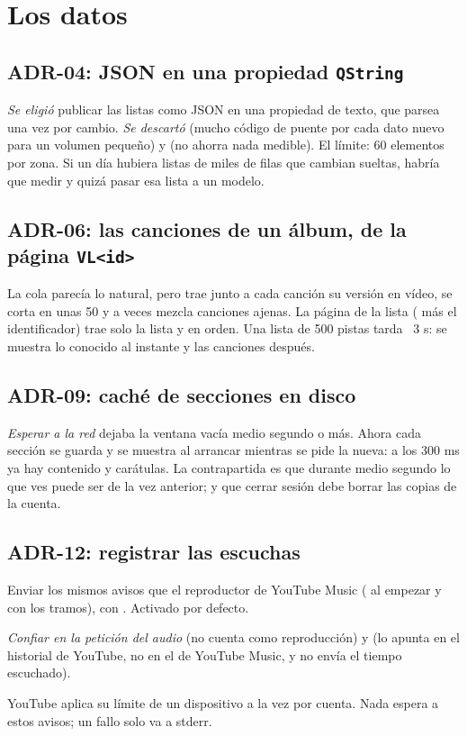 \section{Los datos}

\subsection{ADR-04: JSON en una propiedad \texttt{QString}}

\emph{Se eligió} publicar las listas como JSON en una propiedad de texto, que
 parsea una vez por cambio. \emph{Se descartó} 
(mucho código de puente por cada dato nuevo para un volumen pequeño) y  (no
ahorra nada medible). El límite: 60 elementos por zona. Si un día hubiera listas de miles de
filas que cambian sueltas, habría que medir y quizá pasar esa lista a un modelo.

\subsection{ADR-06: las canciones de un álbum, de la página \texttt{VL<id>}}

La cola  parecía lo natural, pero trae junto a cada canción su versión en vídeo, se
corta en unas 50 y a veces mezcla canciones ajenas. La página de la lista ( más el
identificador) trae solo la lista y en orden. Una lista de 500 pistas tarda ~3 s: se muestra
lo conocido al instante y las canciones después.

\subsection{ADR-09: caché de secciones en disco}

\emph{Esperar a la red} dejaba la ventana vacía medio segundo o más. Ahora cada sección se
guarda y se muestra al arrancar mientras se pide la nueva: a los 300 ms ya hay contenido y
carátulas. La contrapartida es que durante medio segundo lo que ves puede ser de la vez
anterior; y que cerrar sesión debe borrar las copias de la cuenta.

\subsection{ADR-12: registrar las escuchas}

\begin{description}[style=nextline, leftmargin=0pt]
  \item[Se eligió] Enviar los mismos avisos que el reproductor de YouTube Music
  ( al empezar y  con los tramos), con
  . Activado por defecto.
  \item[Se descartó] \emph{Confiar en la petición del audio} (no cuenta como reproducción) y
   (lo apunta en el historial de YouTube, no en el de YouTube
  Music, y no envía el tiempo escuchado).
  \item[Consecuencia] YouTube aplica su límite de un dispositivo a la vez por cuenta. Nada
  espera a estos avisos; un fallo solo va a stderr.
\end{description}

